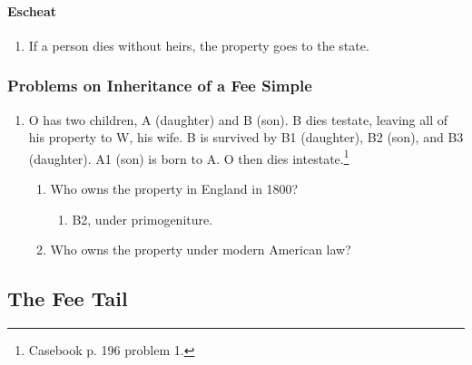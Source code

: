 \paragraph{Escheat}

\begin{enumerate}
    \item If a person dies without heirs, the property goes to the state.
\end{enumerate}

\subsubsection{Problems on Inheritance of a Fee Simple}

\begin{enumerate}
    \item O has two children, A (daughter) and B (son). B dies testate, 
    leaving all of his property to W, his wife. B is survived by B1 
    (daughter), B2 (son), and B3 (daughter). A1 (son) is born to A. O then 
    dies intestate.\footnote{Casebook p. 196 problem 1.}
    \begin{enumerate}
        \item Who owns the property in England in 1800?
        \begin{enumerate}
            \item B2, under primogeniture.
        \end{enumerate}
        \item Who owns the property under modern American law?
    \end{enumerate}
\end{enumerate}

\subsection{The Fee Tail}


